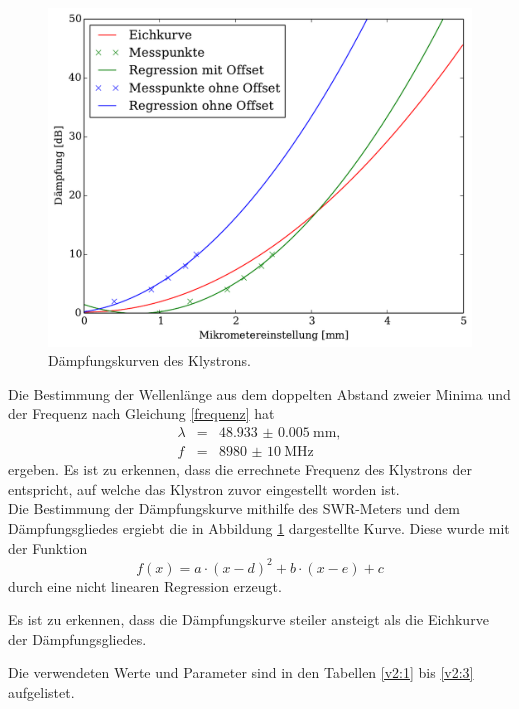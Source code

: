\begin{figure}
	\includegraphics[width = 14cm]{pic/Daempfung.pdf}
	\caption[]{Dämpfungskurven des Klystrons.}
	\label{daempf}
\end{figure}

Die Bestimmung der Wellenlänge aus dem doppelten Abstand zweier Minima und der Frequenz nach Gleichung \eqref{frequenz} hat
\begin{eqnarray}
	\lambda &=& \SI{48.933(5)}{\milli\meter},\\
	f &=& \SI{8980(10)}{\mega\hertz}
\end{eqnarray}
ergeben.
Es ist zu erkennen, dass die errechnete Frequenz des Klystrons der entspricht, auf welche das Klystron zuvor eingestellt worden ist.\\

Die Bestimmung der Dämpfungskurve mithilfe des SWR-Meters und dem Dämpfungsgliedes ergiebt die in Abbildung \ref{daempf} dargestellte Kurve.
Diese wurde mit der Funktion
\begin{equation}
	f(x)=a \cdot (x-d)^2 + b \cdot (x-e) + c
\end{equation}
 durch eine nicht linearen Regression erzeugt.

Es ist zu erkennen, dass die Dämpfungskurve steiler ansteigt als die Eichkurve der Dämpfungsgliedes.

Die verwendeten Werte und Parameter sind in den Tabellen \ref{v2:1} bis \ref{v2:3} aufgelistet.

